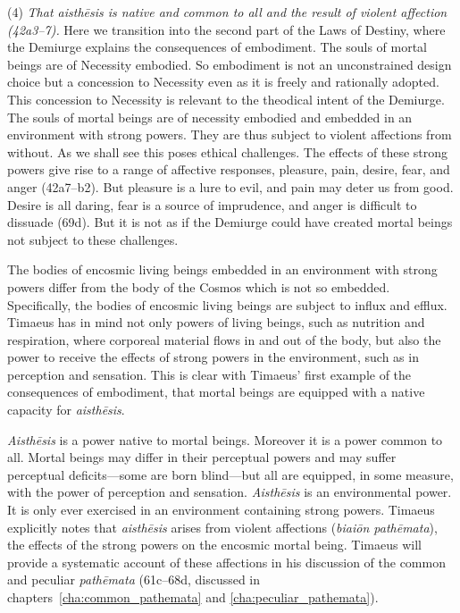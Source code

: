 (4) \emph{That \emph{aisthēsis} is native and common to all and the result of violent affection (42a3--7).} Here we transition into the second part of the Laws of Destiny, where the Demiurge explains the consequences of embodiment. The souls of mortal beings are of Necessity embodied. So embodiment is not an unconstrained design choice but a concession to Necessity even as it is freely and rationally adopted. This concession to Necessity is relevant to the theodical intent of the Demiurge. The souls of mortal beings are of necessity embodied and embedded in an environment with strong powers. They are thus subject to violent affections from without. As we shall see this poses ethical challenges. The effects of these strong powers give rise to a range of affective responses, pleasure, pain, desire, fear, and anger (42a7--b2). But pleasure is a lure to evil, and pain may deter us from good. Desire is all daring, fear is a source of imprudence, and anger is difficult to dissuade (69d). But it is not as if the Demiurge could have created mortal beings not subject to these challenges.

The bodies of encosmic living beings embedded in an environment with strong powers differ from the body of the Cosmos which is not so embedded. Specifically, the bodies of encosmic living beings are subject to influx and efflux. Timaeus has in mind not only powers of living beings, such as nutrition and respiration, where corporeal material flows in and out of the body, but also the power to receive the effects of strong powers in the environment, such as in perception and sensation. This is clear with Timaeus' first example of the consequences of embodiment, that mortal beings are equipped with a native capacity for \emph{aisthēsis}.

\emph{Aisthēsis} is a power native to mortal beings. Moreover it is a power common to all. Mortal beings may differ in their perceptual powers and may suffer perceptual deficits---some are born blind---but all are equipped, in some measure, with the power of perception and sensation. \emph{Aisthēsis} is an environmental power. It is only ever exercised in an environment containing strong powers. Timaeus explicitly notes that \emph{aisthēsis} arises from violent affections (\emph{biaiōn pathēmata}), the effects of the strong powers on the encosmic mortal being. Timaeus will provide a systematic account of these affections in his discussion of the common and peculiar \emph{pathēmata} (61c--68d, discussed in chapters~\ref{cha:common_pathemata} and \ref{cha:peculiar_pathemata}).

